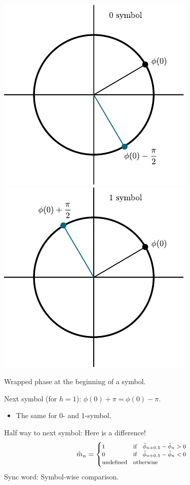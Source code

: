 \begin{frame}
\begin{center}
         {
            \includegraphics[scale=0.7]{img/symboldecision_animation/0symbol3} \quad
            \includegraphics[scale=0.7]{img/symboldecision_animation/1symbol3}
        }
    \end{center}
     {
        Wrapped phase at the beginning of a symbol.
    }
     {
        Next symbol (for $h=1$): $\phi(0) + \pi = \phi(0) - \pi$.
        \begin{itemize}
        \item The same for 0- and 1-symbol.
        \end{itemize}
    }
     {
        Half way to next symbol: Here is a difference!
        \begin{equation*}\footnotesize
            \hat{m}_n = \begin{cases}
                1  &\text{if} \quad \hat{\phi}_{n+0.5} - \hat{\phi}_{n}  >  0\\
                0  &\text{if} \quad \hat{\phi}_{n+0.5} - \hat{\phi}_{n}  <  0\\
                \text{undefined}  & \text{otherwise}
            \end{cases}
        \end{equation*}
        Sync word: Symbol-wise comparison.
    }
\end{frame}

